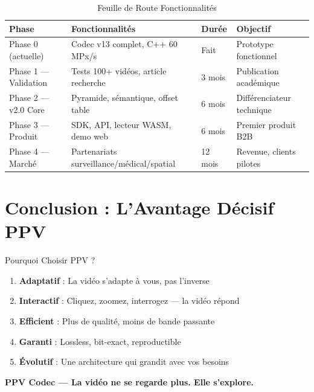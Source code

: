 \documentclass[12pt,a4paper]{article}
\begin{document}
	\begin{table}[h]
		\centering
		\caption{Feuille de Route Fonctionnalités}
		\label{tab:roadmap}
		\begin{tabular}{@{}llll@{}}
			\toprule
			\textbf{Phase} & \textbf{Fonctionnalités} & \textbf{Durée} & \textbf{Objectif} \\ \midrule
			Phase 0 (actuelle) & Codec v13 complet, C++ 60 MPx/s & Fait & Prototype fonctionnel \\
			Phase 1 — Validation & Tests 100+ vidéos, article recherche & 3 mois & Publication académique \\
			Phase 2 — v2.0 Core & Pyramide, sémantique, offset table & 6 mois & Différenciateur technique \\
			Phase 3 — Produit & SDK, API, lecteur WASM, demo web & 6 mois & Premier produit B2B \\
			Phase 4 — Marché & Partenariats surveillance/médical/spatial & 12 mois & Revenue, clients pilotes \\
			\bottomrule
		\end{tabular}
	\end{table}
	
	\section{Conclusion : L'Avantage Décisif PPV}
	
	\begin{featurebox}{Pourquoi Choisir PPV ?}
		\begin{enumerate}[leftmargin=*]
			\item \textbf{Adaptatif} : La vidéo s'adapte à vous, pas l'inverse
			\item \textbf{Interactif} : Cliquez, zoomez, interrogez — la vidéo répond
			\item \textbf{Efficient} : Plus de qualité, moins de bande passante
			\item \textbf{Garanti} : Lossless, bit-exact, reproductible
			\item \textbf{Évolutif} : Une architecture qui grandit avec vos besoins
		\end{enumerate}
	\end{featurebox}
	
	\begin{center}
		\textbf{\Large \color{ppvblue} PPV Codec — La vidéo ne se regarde plus. Elle s'explore.}
	\end{center}
	
\end{document}
